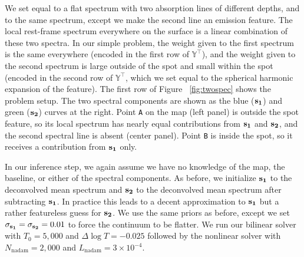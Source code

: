 \documentclass[modern]{aastex631}
\begin{document}

We set  equal to a flat spectrum with two absorption lines of different depths, and  to the same spectrum, except we make the second line an emission feature. 
The local rest-frame spectrum everywhere on the surface is a linear combination of these two spectra. 
In our simple problem, the weight given to the first spectrum is the same everywhere (encoded in the first row of $\mathbb{Y}^\top$), and the weight given to the second spectrum is large outside of the spot and small within the spot (encoded in the second row of $\mathbb{Y}^\top$, which we set equal to the spherical harmonic expansion of the \spot feature).
The first row of Figure ~\ref{fig:twospec} shows the problem setup. 
The two spectral components are shown as the blue (${\mathbf{s_1}}$) and green (${\mathbf{s_2}}$) curves at the right. 
Point \texttt{A} on the map (left panel) is outside the spot feature, so its local spectrum has nearly equal contributions from ${\mathbf{s_1}}$ and ${\mathbf{s_2}}$, and the second spectral line is absent (center panel). 
Point \texttt{B} is inside the spot, so it receives a contribution from ${\mathbf{s_1}}$ only.

In our inference step, we again assume we have no knowledge of the map, the baseline, or either of the spectral components. 
As before, we initialize ${\mathbf{s_1}}$ to the deconvolved mean spectrum and ${\mathbf{s_2}}$ to the deconvolved mean spectrum after subtracting ${\mathbf{s_1}}$. 
In practice this leads to a decent approximation to ${\mathbf{s_1}}$ but a rather featureless guess for ${\mathbf{s_2}}$. 
We use the same priors as before, except we set $\sigma_{\mathbf{s_1}} = \sigma_{\mathbf{s_2}} = 0.01$ to force the continuum to be flatter. 
We run our bilinear solver with $T_0 = 5,000$ and $\Delta\log T = -0.025$ followed by the nonlinear solver with $N_\mathrm{nadam} = 2,000$ and $L_\mathrm{nadam} = 3\times 10^{-4}$.
\end{document}

